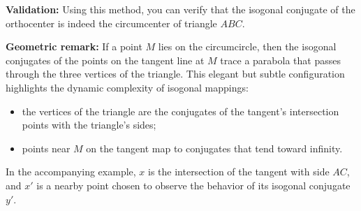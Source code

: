 \medskip

\textbf{Validation:} Using this method, you can verify that the isogonal conjugate of the orthocenter is indeed the circumcenter of triangle $ABC$.

\medskip

\textbf{Geometric remark:} If a point $M$ lies on the circumcircle, then the isogonal conjugates of the points on the tangent line at $M$ trace a parabola that passes through the three vertices of the triangle. This elegant but subtle configuration highlights the dynamic complexity of isogonal mappings:
\begin{itemize}
  \item the vertices of the triangle are the conjugates of the tangent's intersection points with the triangle’s sides;
  \item points near $M$ on the tangent map to conjugates that tend toward infinity.
\end{itemize}

\medskip

In the accompanying example, $x$ is the intersection of the tangent with side $AC$, and $x'$ is a nearby point chosen to observe the behavior of its isogonal conjugate $y'$.

\vspace{1em}

 \begin{tkzexample}[latex = 6cm]
\begin{center}
\end{center}
 \end{tkzexample}


